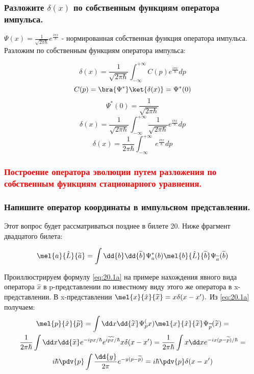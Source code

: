 \subsubsection{Разложите $\delta(x)$  по собственным функциям оператора импульса.}


$\Psi(x)=\frac{1}{\sqrt{2\pi \hbar}}e^{\frac{i\pi x}{\hbar}}$ - нормированная собственная функция оператора импульса. Разложим по собственным функциям оператора импульса:

$$\delta(x) = \frac{1}{\sqrt{2\pi \hbar}}\int_{-\infty}^{+\infty} C(p) e^{\frac{i\pi x}{\hbar}} dp$$
$$C(p)=\bra{\Psi^*} \ket{\delta(x)}=\Psi^*(0)$$
$$\Psi^*(0)=\frac{1}{\sqrt{2\pi \hbar}}$$
$$\delta(x) = \frac{1}{\sqrt{2\pi \hbar}}\int_{-\infty}^{+\infty} \frac{1}{\sqrt{2\pi \hbar}} e^{\frac{i\pi x}{\hbar}} dp$$
$$\delta(x) = \frac{1}{2\pi \hbar}\int_{-\infty}^{+\infty} \ e^{\frac{i\pi x}{\hbar}} dp$$

\subsubsection{\textcolor{red} {Построение оператора эволюции путем разложения по собственным функциям стационарного уравнения.} }

\subsubsection{{Напишите оператор координаты в импульсном представлении.} }

Этот вопрос будет рассматриваться позднее в билете 20. Ниже фрагмент двадцатого билета:

\begin{equation}
	\label{eq:20.1a}
	\mel{a}{\hat{L}}{\tilde a}=\int \dd{b}\dd{\tilde b} \Psi_a^*(b)\mel{b}{\hat L}{\tilde b} \Psi_{\tilde a}(\tilde b)
\end{equation}

Проиллюстрируем формулу \eqref{eq:20.1a} на примере нахождения явного вида оператора $\hat x$ в p-представлении по известному виду этого же оператора в x-представлении. В x-представлении $\mel{x}{\hat x}{\tilde x}=x\delta(x-x').$ Из \eqref{eq:20.1a} получаем:
\begin{gather*}
	\mel{p}{\hat x}{\tilde p}=\int \dd x \dd{\tilde x} \Psi_p^(x)\mel{x}{\hat x }{\tilde x}\Psi_{\tilde p}(\tilde x)=
	\\
	\frac{1}{2\pi\hbar}\int \dd x \dd{\tilde x} e^{-ipx/\hbar}e^{i\tilde p \tilde x/\hbar}x \delta(x-x')=\frac{1}{2\pi\hbar}\int x\dd x e^{-ix(p-\tilde p)/\hbar}=\\
	i\hbar\pdv{p}\int \frac{\dd{y}}{2\pi}e^{-y(p-\tilde p)}=i\hbar\pdv{p} \delta(x-x')
\end{gather*}